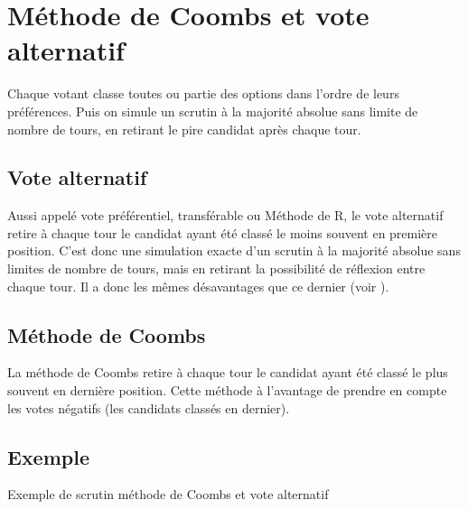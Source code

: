 \documentclass[../report]{subfiles}
\begin{document}
  \section{Méthode de Coombs et vote alternatif}

  Chaque votant classe toutes ou partie des options dans l'ordre de leurs préférences.
  Puis on simule un scrutin à la majorité absolue sans limite de nombre de tours, en retirant le pire candidat
  après chaque tour.

  \subsection{Vote alternatif}
  Aussi appelé vote préférentiel, transférable ou Méthode de R, le vote alternatif retire à chaque 
  tour le candidat ayant été classé le moins souvent en première position.
  C'est donc une simulation exacte d'un scrutin à la majorité absolue sans limites de nombre de tours, 
  mais en retirant la possibilité de réflexion entre chaque tour. 
  Il a donc les mêmes désavantages que ce dernier (voir ).

  \subsection{Méthode de Coombs}
  La méthode de Coombs retire à chaque tour le candidat ayant été classé le plus souvent en dernière position.
  Cette méthode à l'avantage de prendre en compte les votes négatifs (les candidats classés en dernier).

  \subsection{Exemple}

  \begin{table}[h]
    \begin{center}
      \caption{Exemple de scrutin méthode de Coombs et vote alternatif}%
      \label{fig:diff:coombs:caslim1}
      \\[1em]
    \end{center}
  \end{table}
\end{document}
